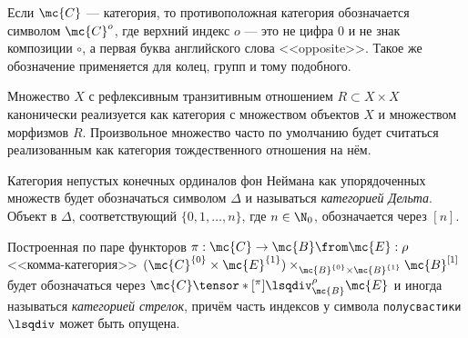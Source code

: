 \documentclass[
	extrafontsizes,
	11pt,
	hyphens,
]{memoir}
\begin{document}
\begin{notation}
Если \(\mc{C}\) --- категория, то противоположная категория обозначается символом \(\mc{C}^o\),
где верхний индекс \(o\) --- это не цифра \(0\) и не знак композиции \(\circ\), а первая буква английского слова <<\textenglish{opposite}>>.
Такое же обозначение применяется для колец, групп и тому подобного.
\end{notation}

\begin{convention}
Множество \(X\) с рефлексивным транзитивным отношением \(R \subset X \times X\) канонически реализуется как категория с множеством объектов \(X\) и множеством морфизмов \(R\).
Произвольное множество часто по умолчанию будет считаться реализованным как категория тождественного отношения на нём.
\end{convention}

\begin{notation}
Категория непустых конечных ординалов фон Неймана как упорядоченных множеств будет обозначаться символом \(\Delta\) и называться \emph{категорией Дельта}.
Объект в \(\Delta\), соответствующий \(\{0, 1, \dots{}, n\}\), где \(n \in \N_0\), обозначается через \([n]\).
\end{notation}


\begin{convention}
Построенная по паре функторов \(\pi : \mc{C} \to \mc{B} \from \mc{E} : \rho\) <<комма-категория>>
\((\mc{C}^{\{0\}} \times \mc{E}^{\{1\}}) \times_{\mc{B}^{\{0\}} \times \mc{B}^{\{1\}}} \mc{B}^{[1]}\)
будет обозначаться через \(\mc{C} \tensor*[^\pi]{\lsqdiv}{^\rho_{\mc{B}}} \mc{E}\) и иногда называться \emph{категорией стрелок}, причём часть индексов у символа \texttt{полусвастики} \(\lsqdiv\) может быть опущена.
\end{convention}
\end{document}
